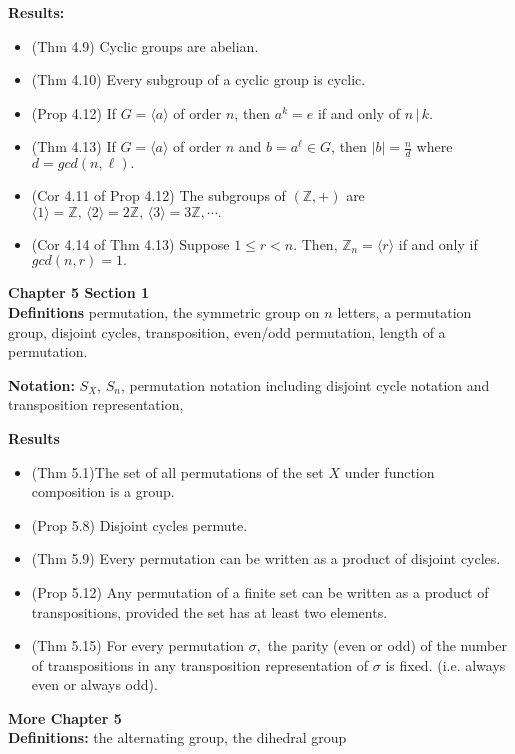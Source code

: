 \documentclass[12pt]{article}
\newcommand{\bbZ}{\mathbb{Z}}
\newcommand{\divs}{\, \big | \,}
\begin{document}
\textbf{Results:}
\begin{itemize}
	\item (Thm 4.9) Cyclic groups are abelian.
	\item (Thm 4.10) Every subgroup of a cyclic group is cyclic.
	\item (Prop 4.12) If $G=\langle a \rangle$ of order $n$, then $a^k=e$ if and only of $n \divs k.$
	\item (Thm 4.13)  If $G=\langle a \rangle$ of order $n$ and $b=a^\ell \in G$, then $|b|=\frac{n}{d}$ where $d=gcd(n,\ell).$
	\item (Cor 4.11 of Prop 4.12) The subgroups of $(\bbZ,+)$ are $\langle 1 \rangle=\bbZ, \, \langle 2 \rangle=2\bbZ, \, \langle 3 \rangle=3\bbZ, \cdots.$
	\item  (Cor 4.14 of Thm 4.13) Suppose $1 \leq r < n.$ Then,
	$\bbZ_n=\langle r \rangle$ if and only if $gcd(n,r)=1.$
\end{itemize}



\noindent \textbf{Chapter 5 Section 1}\\

\textbf{Definitions} permutation, the symmetric group on $n$ letters, a permutation group, disjoint cycles, transposition, even/odd permutation, length of a permutation.

\textbf{Notation:} $S_X$, $S_n$, permutation notation including disjoint cycle notation and transposition representation,

\textbf{Results}
\begin{itemize}
	\item (Thm 5.1)The set of all permutations of the set $X$ under function composition is a group.
	\item (Prop 5.8) Disjoint cycles permute.
	\item (Thm 5.9) Every permutation can be written as a product of disjoint cycles.
	\item (Prop 5.12) Any permutation of a finite set can be written as a product of transpositions, provided the set has at least two elements.
	\item (Thm 5.15) For every permutation $\sigma,$ the parity (even or odd) of the number of transpositions in any transposition representation of $\sigma$ is fixed. (i.e. always even or always odd).
\end{itemize}

\noindent \textbf{More Chapter 5}\\

\noindent \textbf{Definitions:} the alternating group, the dihedral group
\end{document}
